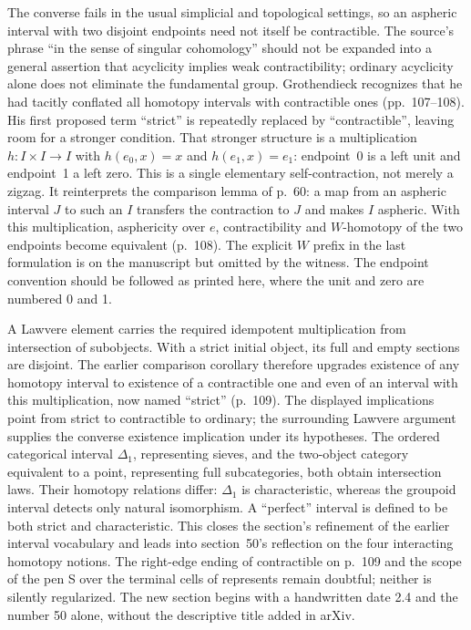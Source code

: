 The converse fails in the usual simplicial and topological settings, so an aspheric interval with two disjoint endpoints need not itself be contractible. The source's phrase ``in the sense of singular cohomology'' should not be expanded into a general assertion that acyclicity implies weak contractibility; ordinary acyclicity alone does not eliminate the fundamental group. Grothendieck recognizes that he had tacitly conflated all homotopy intervals with contractible ones (pp.~107--108). His first proposed term ``strict'' is repeatedly replaced by ``contractible'', leaving room for a stronger condition. That stronger structure is a multiplication $h:I\times I\to I$ with $h(e_0,x)=x$ and $h(e_1,x)=e_1$: endpoint~0 is a left unit and endpoint~1 a left zero. This is a single elementary self-contraction, not merely a zigzag. It reinterprets the comparison lemma of p.~60: a map from an aspheric interval $J$ to such an $I$ transfers the contraction to $J$ and makes $I$ aspheric. With this multiplication, asphericity over $e$, contractibility and $W$-homotopy of the two endpoints become equivalent (p.~108). The explicit $W$ prefix in the last formulation is on the manuscript but omitted by the witness. The endpoint convention should be followed as printed here, where the unit and zero are numbered 0 and 1.

A Lawvere element carries the required idempotent multiplication from intersection of subobjects. With a strict initial object, its full and empty sections are disjoint. The earlier comparison corollary therefore upgrades existence of any homotopy interval to existence of a contractible one and even of an interval with this multiplication, now named ``strict'' (p.~109). The displayed implications point from strict to contractible to ordinary; the surrounding Lawvere argument supplies the converse existence implication under its hypotheses. The ordered categorical interval $\Delta_1$, representing sieves, and the two-object category equivalent to a point, representing full subcategories, both obtain intersection laws. Their homotopy relations differ: $\Delta_1$ is characteristic, whereas the groupoid interval detects only natural isomorphism. A ``perfect'' interval is defined to be both strict and characteristic. This closes the section's refinement of the earlier interval vocabulary and leads into section~50's reflection on the four interacting homotopy notions. The right-edge ending of contractible on p.~109 and the scope of the pen S over the terminal cells of represents remain doubtful; neither is silently regularized. The new section begins with a handwritten date 2.4 and the number 50 alone, without the descriptive title added in arXiv.

